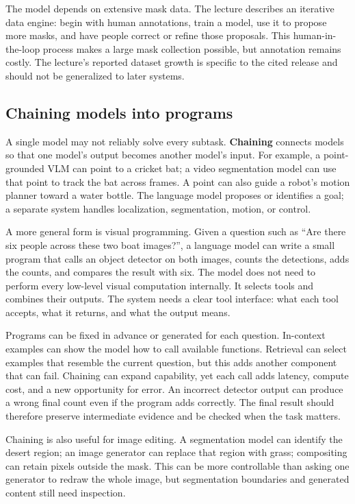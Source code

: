 The model depends on extensive mask data. The lecture describes an iterative data engine: begin with human annotations, train a model, use it to propose more masks, and have people correct or refine those proposals. This human-in-the-loop process makes a large mask collection possible, but annotation remains costly. The lecture's reported dataset growth is specific to the cited release and should not be generalized to later systems.

\subsection{Chaining models into programs}\label{04-visual-computing-ii-ch031-chaining-models-into-programs}

A single model may not reliably solve every subtask. \textbf{Chaining} connects models so that one model's output becomes another model's input. For example, a point-grounded VLM can point to a cricket bat; a video segmentation model can use that point to track the bat across frames. A point can also guide a robot's motion planner toward a water bottle. The language model proposes or identifies a goal; a separate system handles localization, segmentation, motion, or control.

A more general form is visual programming. Given a question such as ``Are there six people across these two boat images?'', a language model can write a small program that calls an object detector on both images, counts the detections, adds the counts, and compares the result with six. The model does not need to perform every low-level visual computation internally. It selects tools and combines their outputs. The system needs a clear tool interface: what each tool accepts, what it returns, and what the output means.

Programs can be fixed in advance or generated for each question. In-context examples can show the model how to call available functions. Retrieval can select examples that resemble the current question, but this adds another component that can fail. Chaining can expand capability, yet each call adds latency, compute cost, and a new opportunity for error. An incorrect detector output can produce a wrong final count even if the program adds correctly. The final result should therefore preserve intermediate evidence and be checked when the task matters.

Chaining is also useful for image editing. A segmentation model can identify the desert region; an image generator can replace that region with grass; compositing can retain pixels outside the mask. This can be more controllable than asking one generator to redraw the whole image, but segmentation boundaries and generated content still need inspection.

